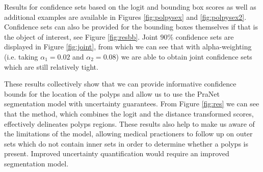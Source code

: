 Results for confidence sets based on the logit and bounding box scores as well as additional examples are available in Figures \ref{fig:polpysex} and \ref{fig:polpysex2}. Confidence sets can also be provided for the bounding boxes themselves if that is the object of interest, see Figure \ref{fig:resbb}. Joint $90\%$ confidence sets are displayed in Figure \ref{fig:joint}, from which we can see that with alpha-weighting (i.e. taking $\alpha_1 = 0.02$ and $\alpha_2 = 0.08$) we are able to obtain joint confidence sets which are still relatively tight.

These results collectively show that we can provide informative confidence bounds for the location of the polyps and allow us to use the PraNet segmentation model with uncertainty guarantees. From Figure \ref{fig:res} we can see that the method, which combines the logit and the distance transformed scores, effectively delineates polyps regions. These results also help to make us aware of the limitations of the model, allowing medical practioners to follow up on outer sets which do not contain inner sets in order to determine whether a polyps is present. Improved uncertainty quantification would require an improved segmentation model. 

